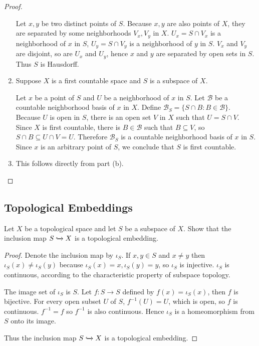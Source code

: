 \begin{proof}
\begin{enumerate}[label={(\alph*)}]
              Let $x, y$ be two distinct points of $S$. Because $x, y$ are also points of $X$, they are separated by some neighborhoods $V_{x}, V_{y}$ in $X$. $U_{x} = S\cap V_{x}$ is a neighborhood of $x$ in $S$, $U_{y} = S\cap V_{y}$ is a neighborhood of $y$ in $S$. $V_{x}$ and $V_{y}$ are disjoint, so are $U_{x}$ and $U_{y}$, hence $x$ and $y$ are separated by open sets in $S$. Thus $S$ is Hausdorff.
        \item Suppose $X$ is a first countable space and $S$ is a subspace of $X$.

              Let $x$ be a point of $S$ and $U$ be a neighborhood of $x$ in $S$. Let $\mathscr{B}$ be a countable neighborhood basis of $x$ in $X$. Define $\mathscr{B}_{S} = \{ S\cap B : B\in\mathscr{B} \}$. Because $U$ is open in $S$, there is an open set $V$ in $X$ such that $U = S\cap V$. Since $X$ is first countable, there is $B\in\mathscr{B}$ such that $B\subseteq V$, so $S\cap B\subseteq U\cap V = U$. Therefore $\mathscr{B}_{S}$ is a countable neighborhood basis of $x$ in $S$. Since $x$ is an arbitrary point of $S$, we conclude that $S$ is first countable.
        \item This follows directly from part (b).
    \end{enumerate}
\end{proof}

\subsection*{Topological Embeddings}

\begin{exercise}{3.13}
    Let $X$ be a topological space and let $S$ be a subspace of $X$. Show that the inclusion map $S\xhookrightarrow{} X$ is a topological embedding.
\end{exercise}

\begin{proof}
    Denote the inclusion map by $\iota_{S}$. If $x, y\in S$ and $x\ne y$ then $\iota_{S}(x)\ne \iota_{S}(y)$ because $\iota_{S}(x) = x, \iota_{S}(y) = y$, so $\iota_{S}$ is injective. $\iota_{S}$ is continuous, according to the characteristic property of subspace topology.

    The image set of $\iota_{S}$ is $S$. Let $f: S\to S$ defined by $f(x) = \iota_{S}(x)$, then $f$ is bijective. For every open subset $U$ of $S$, $f^{-1}(U) = U$, which is open, so $f$ is continuous. $f^{-1} = f$ so $f^{-1}$ is also continuous. Hence $\iota_{S}$ is a homeomorphism from $S$ onto its image.

    Thus the inclusion map $S\xhookrightarrow{} X$ is a topological embedding.
\end{proof}

